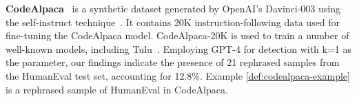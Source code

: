 

\textbf{CodeAlpaca}~\citep{codealpaca} is a synthetic dataset generated by OpenAI's Davinci-003 using the self-instruct technique~\citep{wang2023selfinstruct}.
It contains 20K instruction-following data used for fine-tuning the CodeAlpaca model. 
CodeAlpaca-20K is used to train a number of well-known models, including Tulu~\citep{wang2023far}.
Employing GPT-4 for detection with k=1 as the parameter, our findings indicate the presence of 21 rephrased samples from the HumanEval test set, accounting for 12.8\%. 
Example \ref{def:codealpaca-example} is a rephrased sample of HumanEval in CodeAlpaca.

